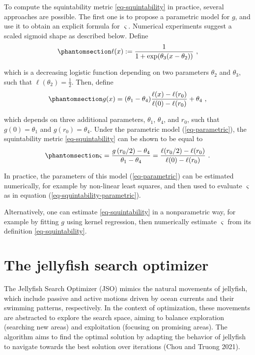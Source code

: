 \documentclass[
  12pt,
]{interact}
\theoremstyle{plain}
\begin{document}
To compute the squintability metric \eqref{eq-squintability} in
practice, several approaches are possible. The first one is to propose a
parametric model for \(g\), and use it to obtain an explicit formula for
\(\varsigma\). Numerical experiments suggest a scaled sigmoid shape as
described below. Define
\begin{equation}\phantomsection\label{eq-logistic}{
\ell(x):=\frac{1}{1+\exp(\theta_{3}(x-\theta_{2}))}\ ,
}\end{equation}

which is a decreasing logistic function depending on two parameters
\(\theta_2\) and \(\theta_3\), such that
\(\ell(\theta_{2})=\frac{1}{2}\). Then, define
\begin{equation}\phantomsection\label{eq-parametric}{
g(x)=(\theta_{1}-\theta_{4})\frac{\ell(x)-\ell(r_0)}{\ell(0)-\ell(r_0)}+\theta_{4}\ ,
}\end{equation}

which depends on three additional parameters, \(\theta_1\),
\(\theta_4\), and \(r_0\), such that \(g(0)=\theta_1\) and
\(g(r_0)=\theta_4\). Under the parametric model (\ref{eq-parametric}),
the squintability metric \eqref{eq-squintability} can be shown to be
equal to
\begin{equation}\phantomsection\label{eq-squintability-parametric}{
\varsigma=\frac{g\left(r_{0}/2\right)-\theta_{4}}{\theta_{1}-\theta_{4}}=\frac{\ell(r_0/2)-\ell(r_0)}{\ell(0)-\ell(r_0)}\ .
}\end{equation}

In practice, the parameters of this model (\ref{eq-parametric}) can be
estimated numerically, for example by non-linear least squares, and then
used to evaluate \(\varsigma\) as in equation
(\ref{eq-squintability-parametric}).

Alternatively, one can estimate \eqref{eq-squintability} in a
nonparametric way, for example by fitting \(g\) using kernel regression,
then numerically estimate \(\varsigma\) from its definition
\eqref{eq-squintability}.

\section{The jellyfish search optimizer}\label{sec-JSO}

The Jellyfish Search Optimizer (JSO) mimics the natural movements of
jellyfish, which include passive and active motions driven by ocean
currents and their swimming patterns, respectively. In the context of
optimization, these movements are abstracted to explore the search
space, aiming to balance exploration (searching new areas) and
exploitation (focusing on promising areas). The algorithm aims to find
the optimal solution by adapting the behavior of jellyfish to navigate
towards the best solution over iterations (Chou and Truong 2021).
\end{document}
